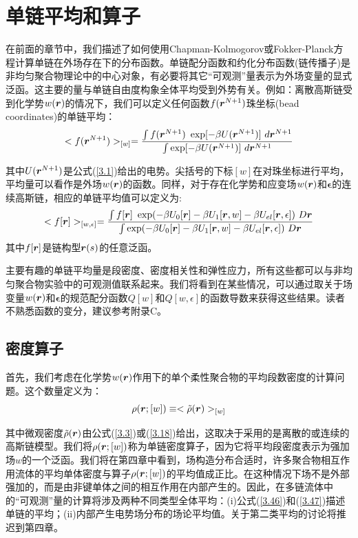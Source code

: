 \section{单链平均和算子}
\begin{center}
\author{何志娟}
\end{center}

在前面的章节中，我们描述了如何使用Chapman-Kolmogorov或Fokker-Planck方程计算单链在外场存在下的分布函数。单链配分函数和约化分布函数(链传播子)是非均匀聚合物理论中的中心对象，有必要将其它“可观测”量表示为外场变量的显式泛函。这主要的量与单链自由度构象全体平均受到外势有关。例如：离散高斯链受到化学势$w (\bm{r})$的情况下，我们可以定义任何函数$f(\bm{r}^{N+1})$珠坐标(bead coordinates)的单链平均：
\begin{equation}\label{3.46}
<f(\bm{r}^{N+1})>_{[w]}= \frac{\int  f(\bm{r}^{N+1})~\exp[-\beta U(\bm{r}^{N+1})]~d \bm{r}^{N+1}}{\int \exp[-\beta U(\bm{r}^{N+1})]~d\bm{r}^{N+1}}
\end{equation}

其中$U(\bm{r}^{N+1})$是公式(\ref{3.1})给出的电势。尖括号的下标$[w]$在对珠坐标进行平均，平均量可以看作是外场$w(\bm{r})$的函数。同样，对于存在化学势和应变场$w(\bm{r})$和$\mathbf{\epsilon}$的连续高斯链，相应的单链平均值可以定义为:
\begin{equation}\label{3.47}
<f[\bm{r}]>_{[w ,\epsilon]}=\frac{\int f[\bm{r}]~\exp(-\beta U_{0}[\bm{r}]-\beta U_{1}[\bm{r},w]-\beta U_{el}[\bm{r},\epsilon])~D\bm{r}}{\int \exp(-\beta U_{0}[\bm{r}]-\beta U_{1}[\bm{r},w]-\beta U_{el}[\bm{r},\epsilon])~D\bm{r}}
\end{equation}
其中$f[\bm{r}]$是链构型$\bm{r}(s)$的任意泛函。

主要有趣的单链平均量是段密度、密度相关性和弹性应力，所有这些都可以与非均匀聚合物实验中的可观测值联系起来。我们将看到在某些情况，可以通过取关于场变量$w(\bm{r})$和$\mathbf{\epsilon}$的规范配分函数$Q[w]$和$Q[w,\epsilon]$的函数导数来获得这些结果。读者不熟悉函数的变分，建议参考附录C。
\subsection{密度算子}
首先，我们考虑在化学势$w(\bm{r})$作用下的单个柔性聚合物的平均段数密度的计算问题。这个数量定义为：
\begin{equation}\label{3.48}
\rho(\bm{r};[w])\equiv<\tilde{\rho}(\bm{r})>_{[w]}
\end{equation}

其中微观密度$\tilde{\rho}(\bm{r})$由公式(\ref{3.3})或(\ref{3.18})给出，这取决于采用的是离散的或连续的高斯链模型。我们将$\rho(\bm{r};[w])$称为单链密度算子，因为它将平均段密度表示为强加场$w$的一个泛函。我们将在第四章中看到，场构造分布合适时，许多聚合物相互作用流体的平均单体密度与算子$\rho(\bm{r};[w])$的平均值成正比。在这种情况下场不是外部强加的，而是由非键单体之间的相互作用在内部产生的。因此，在多链流体中的“可观测”量的计算将涉及两种不同类型全体平均：(i)公式(\ref{3.46})和(\ref{3.47})描述单链的平均；(ii)内部产生电势场分布的场论平均值。关于第二类平均的讨论将推迟到第四章。

